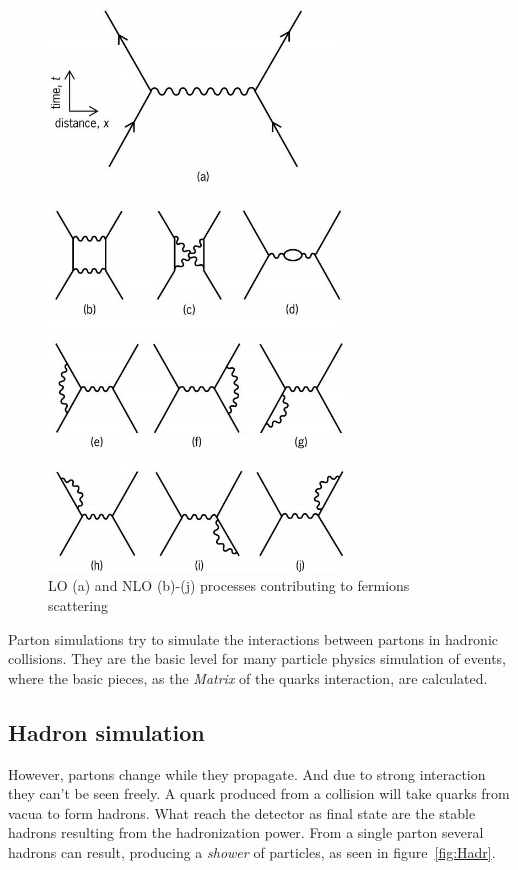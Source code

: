 \begin{figure}[!Hhtbp]
  \begin{center}
    \includegraphics[width=0.7\textwidth]{figs/Feynman_diagrams.jpg}
    \caption{LO (a) and NLO (b)-(j) processes contributing to fermions scattering}
    \label{fig:LOpNLO}
  \end{center}
\end{figure}

Parton simulations try to simulate the interactions between partons in hadronic collisions. They are the basic level for many particle physics simulation of events, where the basic pieces, as the \textit{Matrix} of the quarks interaction, are calculated.

\subsection{Hadron simulation}
\label{sec:hadron}

However, partons change while they propagate. And due to strong interaction they can't be seen freely. A quark produced from a collision will take quarks from vacua to form hadrons. What reach the detector as final state are the stable hadrons resulting from the hadronization power. From a single parton several hadrons can result, producing a \textit{shower} of particles, as seen in figure~\ref{fig:Hadr}. 

